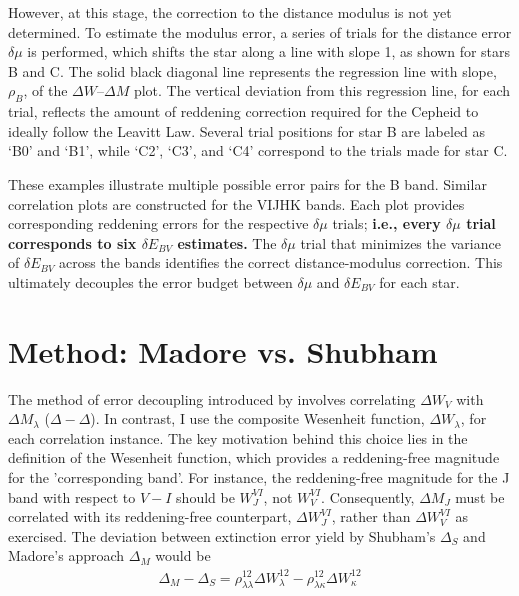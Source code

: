 However, at this stage, the correction to the distance modulus is not yet determined. To estimate the modulus error, a series of trials for the distance error $\delta \mu$ is performed, which shifts the star along a line with slope 1, as shown for stars B and C. The solid black diagonal line represents the regression line with slope, $\rho_{B}$, of the $\Delta W$--$\Delta M$ plot. The vertical deviation from this regression line, for each trial, reflects the amount of reddening correction required for the Cepheid to ideally follow the Leavitt Law. Several trial positions for star B are labeled as `B0' and `B1', while `C2', `C3', and `C4' correspond to the trials made for star C.

These examples illustrate multiple possible error pairs for the B band. Similar correlation plots are constructed for the VIJHK bands. Each plot provides corresponding reddening errors for the respective $\delta \mu$ trials; \textbf{i.e., every $\delta \mu$ trial corresponds to six $\delta E_{BV}$ estimates.} The $\delta \mu$ trial that minimizes the variance of $\delta E_{BV}$ across the bands identifies the correct distance-modulus correction. This ultimately decouples the error budget between $\delta \mu$ and $\delta E_{BV}$ for each star.

\section{Method: Madore vs. Shubham}

The method of error decoupling introduced by \cite{2017madore} involves correlating $\Delta W_V$ with $\Delta M_\lambda$ ($\Delta - \Delta$). In contrast, I use the composite Wesenheit function, $\Delta W_\lambda$, for each correlation instance. The key motivation behind this choice lies in the definition of the Wesenheit function, which provides a reddening-free magnitude for the 'corresponding band'. For instance, the reddening-free magnitude for the J band with respect to $V-I$ should be $W_J^{VI}$, not $W_V^{VI}$. Consequently, $\Delta M_J$ must be correlated with its reddening-free counterpart, $\Delta W_J^{VI}$, rather than $\Delta W_V^{VI}$ as \cite{2017madore} exercised. The deviation between extinction error yield by Shubham's $\Delta_S$ and Madore's approach $\Delta_M$ would be 
\begin{align}
    \label{MS}
    \Delta_M - \Delta_S =   \rho^{12}_{\lambda \lambda} \Delta W^{12}_\lambda -  \rho^{12}_{\lambda \kappa} \Delta W^{12}_\kappa
\end{align}

